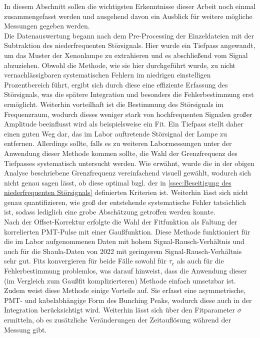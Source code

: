 In diesem Abschnitt sollen die wichtigsten Erkenntnisse dieser Arbeit noch einmal zusammengefasst werden und ausgehend davon ein Ausblick für weitere mögliche Messungen gegeben werden. \\

Die Datenauswertung begann nach dem Pre-Processing der Einzeldateien mit der Subtraktion des niederfrequenten Störsignals. 
Hier wurde ein Tiefpass angewandt, um das Muster der Xenonlampe zu extrahieren und es abschließend vom Signal abzuziehen. 
Obwohl die Methode, wie sie hier durchgeführt wurde, zu nicht vernachlässigbaren systematischen Fehlern im niedrigen einstelligen Prozentbereich führt, ergibt sich durch diese eine effiziente Erfassung des Störsignals, was die spätere Integration und besonders die Fehlerbestimmung erst ermöglicht. 
Weiterhin vorteilhaft ist die Bestimmung des Störsignals im Frequenzraum, wodurch dieses weniger stark von hochfrequenten Signalen großer Amplitude beeinflusst wird als beispielsweise ein Fit. 
Ein Tiefpass stellt daher einen guten Weg dar, das im Labor auftretende Störsignal der Lampe zu entfernen. 
Allerdings sollte, falls es zu weiteren Labormessungen unter der Anwendung dieser Methode kommen sollte, die Wahl der Grenzfrequenz des Tiefpasses systematisch untersucht werden. 
Wie erwähnt, wurde die in der obigen Analyse beschriebene Grenzfrequenz vereinfachend visuell gewählt, wodurch sich nicht genau sagen lässt, ob diese optimal bzgl. der in \autoref{ssec:Beseitigung des niederfrequenten Störsignals} definierten Kriterien ist.
Weiterhin lässt sich nicht genau quantifizieren, wie groß der entstehende systematische Fehler tatsächlich ist, sodass lediglich eine grobe Abschätzung getroffen werden konnte. \\
Nach der Offset-Korrektur erfolgte die Wahl der Fitfunktion als Faltung der korrelierten PMT-Pulse mit einer Gaußfunktion. 
Diese Methode funktioniert für die im Labor aufgenommenen Daten mit hohem Signal-Rausch-Verhältnis und auch für die Shaula-Daten von 2022 mit geringerem Signal-Rausch-Verhältnis sehr gut. 
Fits konvergieren für beide Fälle sowohl für $\tau_\mathrm{c}$ als auch für die Fehlerbestimmung problemlos, was darauf hinweist, dass die Anwendung dieser (im Vergleich zum Gaußfit komplizierteren) Methode einfach umsetzbar ist. 
Zudem weist diese Methode einige Vorteile auf. 
Sie erfasst eine asymmetrische, PMT- und kabelabhängige Form des Bunching Peaks, wodurch diese auch in der Integration berücksichtigt wird. 
Weiterhin lässt sich über den Fitparameter $\sigma$ ermitteln, ob es zusätzliche Veränderungen der Zeitauflösung während der Messung gibt. 
